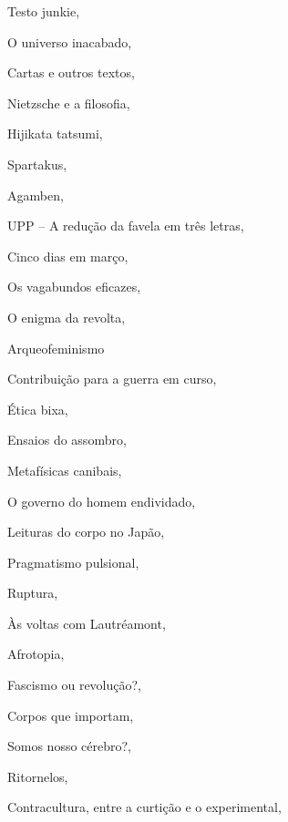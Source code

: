 \begin{multicols}{2}
\begin{enumerate}
{\item Testo junkie, {}
\item O universo inacabado, {}
\item Cartas e outros textos, {}
\item Nietzsche e a filosofia, {}
\item Hijikata tatsumi, {}
\item Spartakus, {}
\item Agamben, {}
\item UPP -- A redução da favela em três letras, {}
\item Cinco dias em março, {}
\item Os vagabundos eficazes, {}
\item O enigma da revolta, {}
\item Arqueofeminismo
\item Contribuição para a guerra em curso, {}
\item Ética bixa, {}
\item Ensaios do assombro, {}
\item Metafísicas canibais, {}
\item O governo do homem endividado, {}
\item Leituras do corpo no Japão, {}
\item Pragmatismo pulsional, {}
\item Ruptura, {}
\item Às voltas com Lautréamont, {}
\item Afrotopia, {}
\item Fascismo ou revolução?, {}
\item Corpos que importam, {}
\item Somos nosso cérebro?, {}
\item Ritornelos, {}
\item Contracultura, entre a curtição e o experimental, {}
}
\end{enumerate}
\end{multicols}

\pagebreak
